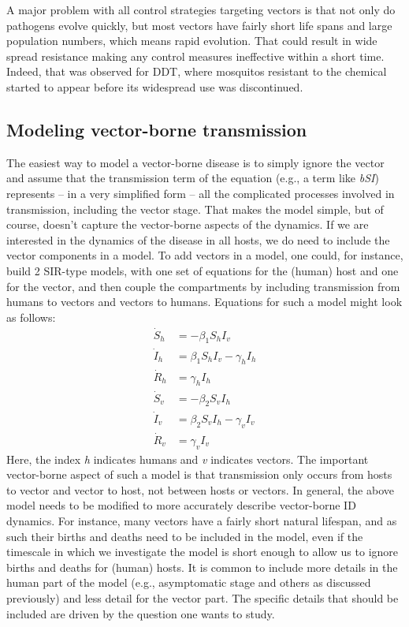 \documentclass[]{article}
\theoremstyle{definition}
\theoremstyle{definition}
\theoremstyle{definition}
\theoremstyle{remark}
\begin{document}
A major problem with all control strategies targeting vectors is that
not only do pathogens evolve quickly, but most vectors have fairly short
life spans and large population numbers, which means rapid evolution.
That could result in wide spread resistance making any control measures
ineffective within a short time. Indeed, that was observed for DDT,
where mosquitos resistant to the chemical started to appear before its
widespread use was discontinued.

\subsection{Modeling vector-borne transmission}\label{myadvancedbox}

The easiest way to model a vector-borne disease is to simply ignore the
vector and assume that the transmission term of the equation (e.g., a
term like \emph{bSI}) represents -- in a very simplified form -- all the
complicated processes involved in transmission, including the vector
stage. That makes the model simple, but of course, doesn't capture the
vector-borne aspects of the dynamics. If we are interested in the
dynamics of the disease in all hosts, we do need to include the vector
components in a model. To add vectors in a model, one could, for
instance, build 2 SIR-type models, with one set of equations for the
(human) host and one for the vector, and then couple the compartments by
including transmission from humans to vectors and vectors to humans.
Equations for such a model might look as follows: \[
\begin{aligned}
\dot S_h &= - \beta_1 S_h I_v \\
\dot I_h &= \beta_1S_h I_v - \gamma_h I_h \\
\dot R_h &= \gamma_h I_h \\
\dot S_v &= - \beta_2 S_v I_h \\
\dot I_v &= \beta_2 S_v I_h - \gamma_v I_v \\
\dot R_v &= \gamma_v I_v
\end{aligned}
\] Here, the index \emph{h} indicates humans and \emph{v} indicates
vectors. The important vector-borne aspect of such a model is that
transmission only occurs from hosts to vector and vector to host, not
between hosts or vectors. In general, the above model needs to be
modified to more accurately describe vector-borne ID dynamics. For
instance, many vectors have a fairly short natural lifespan, and as such
their births and deaths need to be included in the model, even if the
timescale in which we investigate the model is short enough to allow us
to ignore births and deaths for (human) hosts. It is common to include
more details in the human part of the model (e.g., asymptomatic stage
and others as discussed previously) and less detail for the vector part.
The specific details that should be included are driven by the question
one wants to study.
\end{document}
